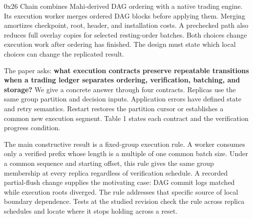 \documentclass[11pt]{article}
\begin{document}
0x26 Chain combines Mahi-derived DAG ordering with a native trading engine. Its execution worker merges ordered DAG blocks before applying them. Merging amortizes checkpoint, root, header, and installation costs. A prechecked path also reduces full overlay copies for selected resting-order batches. Both choices change execution work after ordering has finished. The design must state which local choices can change the replicated result. \cite{R12,R13}

The paper asks: \textbf{what execution contracts preserve repeatable transitions when a trading ledger separates ordering, verification, batching, and storage?} We give a concrete answer through four contracts. Replicas use the same group partition and decision inputs. Application errors have defined state and retry semantics. Restart restores the partition cursor or establishes a common new execution segment. Table 1 states each contract and the verification progress condition.

The main constructive result is a fixed-group execution rule. A worker consumes only a verified prefix whose length is a multiple of one common batch size. Under a common sequence and starting offset, this rule gives the same group membership at every replica regardless of verification schedule. A recorded partial-flush change supplies the motivating case: DAG commit logs matched while execution roots diverged. The rule addresses that specific source of local boundary dependence. Tests at the studied revision check the rule across replica schedules and locate where it stops holding across a reset. \cite{R13,R15,R30}
\end{document}
